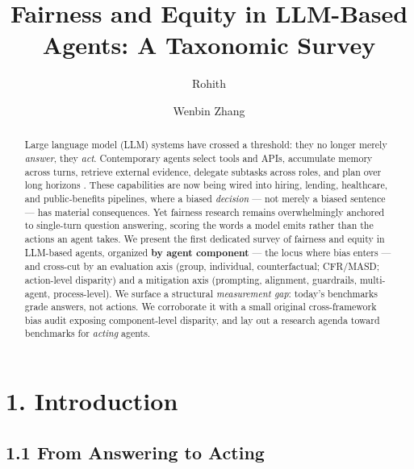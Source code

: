 \documentclass[sigconf,nonacm]{acmart}
\begin{document}
\title{Fairness and Equity in LLM-Based Agents: A Taxonomic Survey}

\author{Rohith}
\affiliation{\institution{}\country{}}

\author{Wenbin Zhang}

\begin{abstract}
Large language model (LLM) systems have crossed a threshold: they no longer merely \emph{answer}, they \emph{act}. Contemporary agents select tools and APIs, accumulate memory across turns, retrieve external evidence, delegate subtasks across roles, and plan over long horizons \cite{wang2024survey, xi2023rise, yao2023react}. These capabilities are now being wired into hiring, lending, healthcare, and public-benefits pipelines, where a biased \emph{decision} — not merely a biased sentence — has material consequences. Yet fairness research remains overwhelmingly anchored to single-turn question answering, scoring the words a model emits rather than the actions an agent takes. We present the first dedicated survey of fairness and equity in LLM-based agents, organized \textbf{by agent component} — the locus where bias enters — and cross-cut by an evaluation axis (group, individual, counterfactual; CFR/MASD; action-level disparity) and a mitigation axis (prompting, alignment, guardrails, multi-agent, process-level). We surface a structural \emph{measurement gap}: today's benchmarks grade answers, not actions. We corroborate it with a small original cross-framework bias audit exposing component-level disparity, and lay out a research agenda toward benchmarks for \emph{acting} agents.
\end{abstract}


\maketitle

\section{1. Introduction}

\subsection{1.1 From Answering to Acting}
\end{document}
